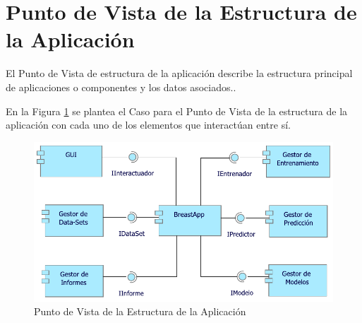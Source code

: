 \newpage
\section{Punto de Vista de la Estructura de la Aplicación}
El Punto de Vista de estructura de la aplicación describe la estructura principal de aplicaciones o componentes y los datos asociados.\cite{BolanosCastro2019}.

En la Figura \ref{PvEstructuraApp} se plantea el Caso para el Punto de Vista de la estructura de la aplicación con cada uno de los elementos que interactúan entre sí. 

\begin{figure}[h!]
	\centering
	\includegraphics[width=1\linewidth]{ARQUITECTURA/imgs/CapaAplicacion/3_PvEstructuraApp}
	\caption{Punto de Vista de la Estructura  de la Aplicación}
	\label{PvEstructuraApp}
\end{figure}

